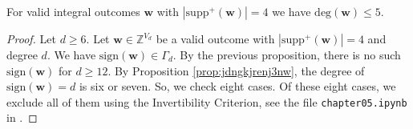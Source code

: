 \begin{theorem}\label{thm:main-result-32432432432nkdnjkfd}
    For valid integral outcomes \( \mathbf w \) with \( |\mathrm{supp}^+(\mathbf w)| = 4 \) we have \( \mathrm{deg}(\mathbf w) \leq 5 \).
\end{theorem}

\begin{proof}
    Let \( d \geq 6 \).
    Let \( \mathbf{w} \in \mathbb{Z}^{V_d} \) be a valid outcome with \( |\mathrm{supp}^+(\mathbf w)| = 4 \) and degree \( d \). We have \( \mathrm{sign}(\mathbf{w}) \in \Gamma_d \). By the previous proposition, there is no such \( \mathrm{sign}(\mathbf{w}) \) for \( d \geq 12 \). By Proposition \ref{prop:jdngkjrenj3nw}, the degree of \( \mathrm{sign}(\mathbf{w}) = d \) is six or seven. So, we check eight cases. Of these eight cases, we exclude all of them using the Invertibility Criterion, see the file \texttt{chapter05.ipynb} in \cite{ducrepo}.
\end{proof}